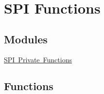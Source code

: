 \hypertarget{group___s_d___s_p_i___functions}{}\section{S\+PI Functions}
\label{group___s_d___s_p_i___functions}
\subsection*{Modules}
\begin{DoxyCompactItemize}
\item 
\mbox{\hyperlink{group___s_d___s_p_i___private___functions}{S\+P\+I Private Functions}}
\end{DoxyCompactItemize}
\subsection*{Functions}
